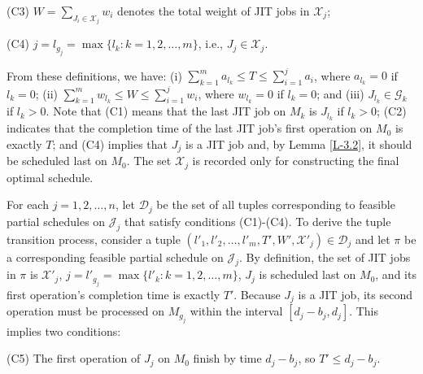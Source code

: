 \documentclass[12pt, eqno, limlimits]{article}
\begin{document}
\begin{sloppypar}
\begin{description}
            \item (C3) $W=\sum_{J_i \in \mathcal{X}_j} w_i$ denotes the total weight of JIT jobs in $\mathcal{X}_j$;
            
            \item (C4) $j=l_{g_j}=\max\{l_k: k=1, 2, \ldots, m\}$, i.e., $J_j \in \mathcal{X}_j$.
        \end{description}
        From these definitions, we have: (i) $\sum_{k=1}^m a_{l_k} \leq T \leq \sum_{i=1}^j a_i$, where $a_{l_k}=0$ if $l_k=0$; (ii) $\sum_{k=1}^m w_{l_k} \leq W \leq \sum_{i=1}^j w_i$, where $w_{l_k}=0$ if $l_k=0$; and (iii) $J_{l_k} \in \mathcal{G}_k$ if $l_k>0$. Note that (C1) means that the last JIT job on $M_k$ is $J_{l_k}$ if $l_k>0$; (C2) indicates that the completion time of the last JIT job's first operation on $M_0$ is exactly $T$; and (C4) implies that $J_j$ is a JIT job and, by Lemma \ref{L-3.2}, it should be scheduled last on $M_0$. The set $\mathcal{X}_j$ is recorded only for constructing the final optimal schedule.
        
        For each $j=1, 2,  \ldots, n$, let $\mathcal{D}_j$ be the set of all tuples corresponding to feasible partial schedules on $\mathcal{J}_j$ that satisfy conditions (C1)-(C4). To derive the tuple transition process, consider a tuple $(l'_1, l'_2, \ldots, l'_m, T', W', \mathcal{X}'_j) \in \mathcal{D}_j$ and let $\pi$ be a corresponding feasible partial schedule on $\mathcal{J}_j$. By definition, the set of JIT jobs in $\pi$ is $\mathcal{X}'_j$, $j=l'_{g_j}=\max\{l'_k: k=1, 2, \ldots, m\}$, $J_j$ is scheduled last on $M_0$, and its first operation's completion time is exactly $T'$. Because $J_j$ is a JIT job, its second operation must be processed on $M_{g_j}$  within the interval $[d_j-b_j, d_j]$. This implies two conditions: 
        \begin{description}
            \item (C5) The first operation of $J_j$ on $M_0$ finish by time $d_j-b_j$, so $T'\leq d_j-b_j$. 
            

\end{description}
\end{sloppypar}
\end{document}
